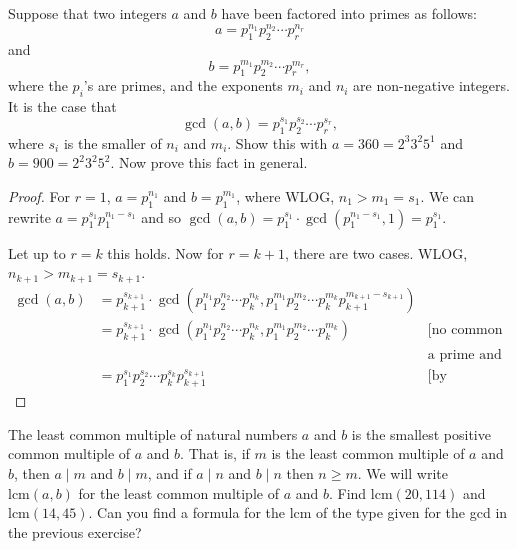 \documentclass[12pt]{article}
\newenvironment{exercise}[2][Exercise]{\begin{trivlist}
\item[\hskip \labelsep {\bfseries #1}\hskip \labelsep {\bfseries #2.}]}{\end{trivlist}}
\begin{document}
\begin{exercise}{10}
Suppose that two integers \(a\) and \(b\) have been factored into primes as follows:
\[
a = p_1^{n_1} p_2^{n_2} \cdots p_r^{n_r}
\]
and
\[
b = p_1^{m_1} p_2^{m_2} \cdots p_r^{m_r},
\]
where the \(p_i\)'s are primes, and the exponents \(m_i\) and \(n_i\) are non-negative integers. It is the case that
\[
\gcd(a, b) = p_1^{s_1} p_2^{s_2} \cdots p_r^{s_r},
\]
where \(s_i\) is the smaller of \(n_i\) and \(m_i\). Show this with \(a = 360 = 2^3 3^2 5^1\) and \(b = 900 = 2^2 3^2 5^2\). Now prove this fact in general.
\end{exercise}

\begin{proof}
For $r=1$, $a=p_1^{n_1}$ and $b=p_1^{m_1}$, where WLOG, $n_1 > m_1=s_1$. We can rewrite $a=p_1^{s_1}p_1^{n_1-s_1}$ and so $\gcd(a,b)=p_1^{s_1}\cdot \gcd(p_1^{n_1-s_1}, 1)=p_1^{s_1}$.

Let up to $r=k$ this holds. Now for $r=k+1$, there are two cases. WLOG, $n_{k+1}>m_{k+1}=s_{k+1}$.
\begin{align*}
    \gcd(a,b) & = p_{k+1}^{s_{k+1}} \cdot \gcd(p_1^{n_1} p_2^{n_2} \cdots p_k^{n_k},
    p_1^{m_1} p_2^{m_2} \cdots p_k^{m_k} p_{k+1}^{m_{k+1}-s_{k+1}}) & \\
    & = p_{k+1}^{s_{k+1}} \cdot \gcd(p_1^{n_1} p_2^{n_2} \cdots p_k^{n_k},    p_1^{m_1} p_2^{m_2} \cdots p_k^{m_k}) & \text{[no common divisor exists between } \\
    & &\text{a prime and other primes.]} \\
    & = p_1^{s_1} p_2^{s_2} \cdots p_k^{s_k} p_{k+1}^{s_{k+1}} & \text{[by induction hypothesis.]}
\end{align*}
\end{proof}

\begin{exercise}{11}
The least common multiple of natural numbers \(a\) and \(b\) is the smallest positive common multiple of \(a\) and \(b\). That is, if \(m\) is the least common multiple of \(a\) and \(b\), then \(a \mid m\) and \(b \mid m\), and if \(a \mid n\) and \(b \mid n\) then \(n \geq m\). We will write \(\text{lcm}(a, b)\) for the least common multiple of \(a\) and \(b\). Find \(\text{lcm}(20, 114)\) and \(\text{lcm}(14, 45)\). Can you find a formula for the lcm of the type given for the gcd in the previous exercise?
\end{exercise}
\end{document}
